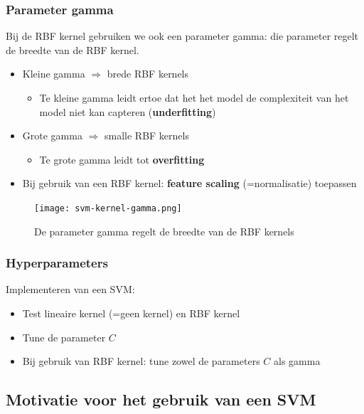 \documentclass{article}
\begin{document}
\subsubsection{Parameter gamma}

Bij de RBF kernel gebruiken we ook een parameter gamma: die parameter 
regelt de breedte van de RBF kernel.

\begin{itemize}
    \item Kleine gamma $\Rightarrow$ brede RBF kernels
    \begin{itemize}
        \item Te kleine gamma leidt ertoe dat het het model de complexiteit van het model niet kan capteren (\textbf{underfitting})
    \end{itemize}
    \item Grote gamma $\Rightarrow$ smalle RBF kernels
    \begin{itemize}
        \item Te grote gamma leidt tot \textbf{overfitting}
    \end{itemize}
    \item Bij gebruik van een RBF kernel: \textbf{feature scaling} (=normalisatie) toepassen
\end{itemize}

\begin{figure}[H]
    \centering
    \texttt{[image: svm-kernel-gamma.png]}
    \caption{De parameter gamma regelt de breedte van de RBF kernels}
\end{figure}

\subsubsection{Hyperparameters}

Implementeren van een SVM:

\begin{itemize}
    \item Test lineaire kernel (=geen kernel) en RBF kernel
    \item Tune de parameter $C$
    \item Bij gebruik van RBF kernel: tune zowel de parameters $C$ als gamma
\end{itemize}

\subsection{Motivatie voor het gebruik van een SVM}
\end{document}

